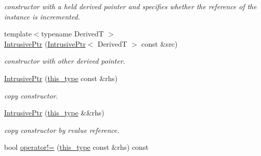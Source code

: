 \begin{DoxyCompactItemize}
\begin{DoxyCompactList}\small\item\em constructor with a held derived pointer and specifies whether the reference of the instance is incremented. \end{DoxyCompactList}\item 
\hypertarget{classhryky_1_1_intrusive_ptr_a99d5812ce929ad04b2269533283c9cae}{{\footnotesize template$<$typename Derived\-T $>$ }\\\hyperlink{classhryky_1_1_intrusive_ptr_a99d5812ce929ad04b2269533283c9cae}{Intrusive\-Ptr} (\hyperlink{classhryky_1_1_intrusive_ptr}{Intrusive\-Ptr}$<$ Derived\-T $>$ const \&src)}\label{classhryky_1_1_intrusive_ptr_a99d5812ce929ad04b2269533283c9cae}

\begin{DoxyCompactList}\small\item\em constructor with other derived pointer. \end{DoxyCompactList}\item 
\hypertarget{classhryky_1_1_intrusive_ptr_a942bdb1ed6d59e80271c0979b44e543b}{\hyperlink{classhryky_1_1_intrusive_ptr_a942bdb1ed6d59e80271c0979b44e543b}{Intrusive\-Ptr} (\hyperlink{classhryky_1_1_intrusive_ptr_a0fb00a7eafa8939e21653f677d1b2989}{this\-\_\-type} const \&rhs)}\label{classhryky_1_1_intrusive_ptr_a942bdb1ed6d59e80271c0979b44e543b}

\begin{DoxyCompactList}\small\item\em copy constructor. \end{DoxyCompactList}\item 
\hypertarget{classhryky_1_1_intrusive_ptr_a8e1f34b5c5ffd6b3f64126f3cef4e908}{\hyperlink{classhryky_1_1_intrusive_ptr_a8e1f34b5c5ffd6b3f64126f3cef4e908}{Intrusive\-Ptr} (\hyperlink{classhryky_1_1_intrusive_ptr_a0fb00a7eafa8939e21653f677d1b2989}{this\-\_\-type} \&\&rhs)}\label{classhryky_1_1_intrusive_ptr_a8e1f34b5c5ffd6b3f64126f3cef4e908}

\begin{DoxyCompactList}\small\item\em copy constructor by rvalue reference. \end{DoxyCompactList}\item 
\hypertarget{classhryky_1_1_intrusive_ptr_a8c2429282077ad6eeeaff6f225921190}{bool \hyperlink{classhryky_1_1_intrusive_ptr_a8c2429282077ad6eeeaff6f225921190}{operator!=} (\hyperlink{classhryky_1_1_intrusive_ptr_a0fb00a7eafa8939e21653f677d1b2989}{this\-\_\-type} const \&rhs) const }\label{classhryky_1_1_intrusive_ptr_a8c2429282077ad6eeeaff6f225921190}


\end{DoxyCompactItemize}
